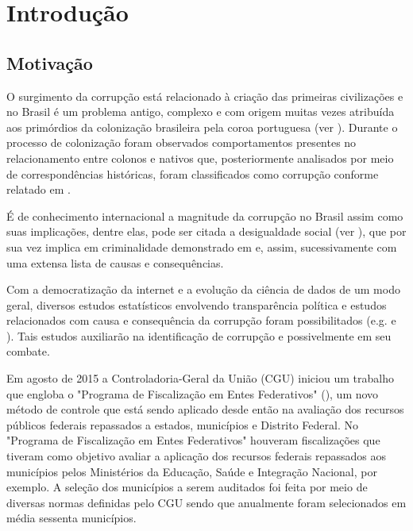 \chapter{Introdução}
\label{cap:introducao}

\section{Motivação}
\label{sec:motivacao}

O surgimento da corrupção está relacionado à criação das primeiras civilizações e no Brasil é um problema antigo, complexo e com origem muitas vezes atribuída aos primórdios da colonização brasileira pela coroa portuguesa (ver \citet{LeiteMacedo2017}). Durante o processo de colonização foram observados comportamentos presentes no relacionamento entre colonos e nativos que, posteriormente analisados por meio de correspondências históricas, foram classificados como corrupção conforme relatado em \citet{LeiteMacedo2017}.

É de conhecimento internacional a magnitude da corrupção no Brasil assim como suas implicações, dentre elas, pode ser citada a desigualdade social (ver \citet{Alves2018}), que por sua vez implica em criminalidade demonstrado em \citet{ResendeAndrade2018} e, assim, sucessivamente com uma extensa lista de causas e consequências.

Com a democratização da internet e a evolução da ciência de dados de um modo geral, diversos estudos estatísticos envolvendo transparência política e estudos relacionados com causa e consequência da corrupção foram possibilitados (e.g. \citet{FerrazFinan2008} e \citet{Ransom2013:MSc}). Tais estudos auxiliarão na identificação de corrupção e possivelmente em seu combate.

Em agosto de 2015 a Controladoria-Geral da União (CGU) iniciou um trabalho que engloba o "Programa de Fiscalização em Entes Federativos" (\cite{CGU}), um novo método de controle que está sendo aplicado desde então na avaliação dos recursos públicos federais repassados a estados, municípios e Distrito Federal. No "Programa de Fiscalização em Entes Federativos" houveram fiscalizações que tiveram como objetivo avaliar a aplicação dos recursos federais repassados aos municípios pelos Ministérios da Educação, Saúde e Integração Nacional, por exemplo. A seleção dos municípios a serem auditados foi feita por meio de diversas normas definidas pelo CGU sendo que anualmente foram selecionados em média sessenta municípios.


